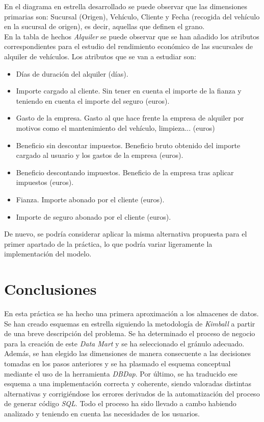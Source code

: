 \documentclass{article}
\begin{document}
En el diagrama en estrella desarrollado se puede observar que las dimensiones primarias son: Sucursal (Origen), Vehículo, Cliente y Fecha (recogida del vehículo en la sucursal de origen), es decir, aquellas que definen el grano.\\

En la tabla de hechos \textit{Alquiler} se puede observar que se han añadido los atributos correspondientes para el estudio del rendimiento económico de las sucursales de alquiler de vehículos. Los atributos que se van a estudiar son:

\begin{itemize}
    \item Días de duración del alquiler (días).
    \item Importe cargado al cliente. Sin tener en cuenta el importe de la fianza y teniendo en cuenta el importe del seguro (euros).
    \item Gasto de la empresa. Gasto al que hace frente la empresa de alquiler por motivos como el mantenimiento del vehículo, limpieza... (euros)
    \item Beneficio sin descontar impuestos. Beneficio bruto obtenido del importe cargado al usuario y los gastos de la empresa (euros).
    \item Beneficio descontando impuestos. Beneficio de la empresa tras aplicar impuestos (euros).
    \item Fianza. Importe abonado por el cliente (euros).
    \item Importe de seguro abonado por el cliente (euros). 
\end{itemize}

De nuevo, se podría considerar aplicar la misma alternativa propuesta para el primer apartado de la práctica, lo que podría variar ligeramente la implementación del modelo.

\newpage
\section{Conclusiones}

En esta práctica se ha hecho una primera aproximación a los almacenes de datos. Se han creado esquemas en estrella siguiendo la metodología de \textit{Kimball} a partir de una breve descripción del problema. Se ha determinado el proceso de negocio para la creación de este \textit{Data Mart} y se ha seleccionado el gránulo adecuado. Además, se han elegido las dimensiones de manera consecuente a las decisiones tomadas en los pasos anteriores y se ha plasmado el esquema conceptual mediante el uso de la herramienta \textit{DBDap}. Por último, se ha traducido ese esquema a una implementación correcta y coherente, siendo valoradas distintas alternativas y corrigiéndose los errores derivados de la automatización del proceso de generar código \textit{SQL}. Todo el proceso ha sido llevado a cambo habiendo analizado y teniendo en cuenta las necesidades de los usuarios.\\
\end{document}
